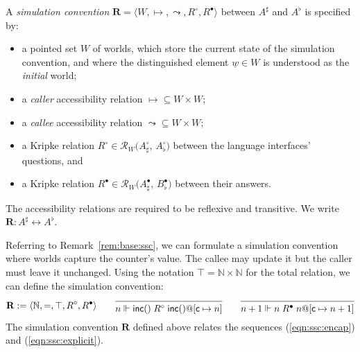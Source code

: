 \documentclass[acmsmall,screen,review,anonymous]{acmart}
\newcommand{\kw}[1]{\ensuremath{ \mathsf{#1} }}
\newcommand{\que}{\circ}
\newcommand{\ans}{\bullet}
\newcommand{\intl}[1]{\underline{#1}}
\begin{document}
\begin{definition} \label{def:sconv} %
A \emph{simulation convention}
$\mathbf{R} = \langle W, {\mapsto}, {\leadsto}, R^\que, R^\ans \rangle$
between %
$A^\sharp$ and $A^\flat$
is specified by:
\begin{itemize}
  \item a pointed set $W$ of worlds,
    which store the current state of the simulation convention,
    and where the distinguished element $\intl{w} \in W$ is understood as the \emph{initial} world;
  \item a \emph{caller} accessibility relation ${\mapsto} \subseteq W \times W$;
  \item a \emph{callee} accessibility relation ${\leadsto} \subseteq W \times W$;
  \item a Kripke relation $R^\que \in \mathcal{R}_W\big(A_\sharp^\que,\, A_\flat^\que\big)$
    between the language interfaces' questions, and
  \item a Kripke relation $R^\ans \in \mathcal{R}_W\big(A_\sharp^\ans,\, B_\flat^\ans\big)$
    between their answers.
\end{itemize}
The accessibility relations are required to be reflexive and transitive.
We write $\mathbf{R} : A^\sharp \leftrightarrow A^\flat$.
\end{definition}

\begin{example} \label{ex:base:ssc} %
Referring to Remark~\ref{rem:base:ssc},
we can formulate a simulation convention
where worlds capture the counter's value.
The callee may update it
but the caller must leave it unchanged.
Using the notation $\top = \mathbb{N} \times \mathbb{N}$
for the total relation,
we can define the simulation convention:
\[
  \mathbf{R} := \langle \mathbb{N}, {=}, \top, R^\que, R^\ans \rangle
  \qquad
  \begin{prooftree}
    \infer0{n \Vdash \kw{inc}() \mathrel{R^\que} \kw{inc}()@[\kw{c} \mapsto n]}
  \end{prooftree}
  \qquad
  \begin{prooftree}
    \infer0{n + 1 \Vdash n \mathrel{R^\ans} n@[\kw{c} \mapsto n + 1]}
  \end{prooftree}
\]
The simulation convention $\mathbf{R}$ defined above
relates the sequences (\ref{eqn:ssc:encap}) and (\ref{eqn:ssc:explicit}).
\end{example}
\end{document}
